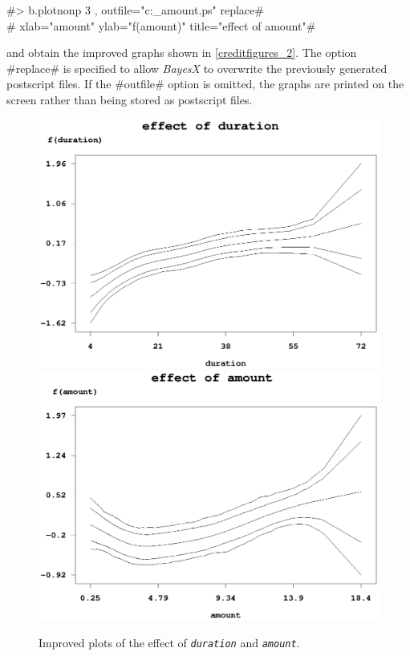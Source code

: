 #> b.plotnonp 3 , outfile="c:\results\credit_amount.ps" replace# \\
#  xlab="amount" ylab="f(amount)" title="effect of amount"#

and obtain the improved graphs shown in \autoref{creditfigures_2}.
The option #replace# is specified to allow {\em BayesX} to
overwrite the previously generated postscript files. If the
#outfile# option is omitted, the graphs are printed on the screen
rather than being stored as postscript files.

\begin{figure}[ht]
\vspace{0.5cm}
\begin{center}
\includegraphics[scale=0.65]{grafiken/credit_duration_2.ps}

\vspace{0.5cm}
\includegraphics[scale=0.65]{grafiken/credit_amount_2.ps}
\end{center}
{\em\caption{ \label{creditfigures_2} Improved plots of the effect
of {\em\tt duration} and {\em\tt amount}.}}
\end{figure}


